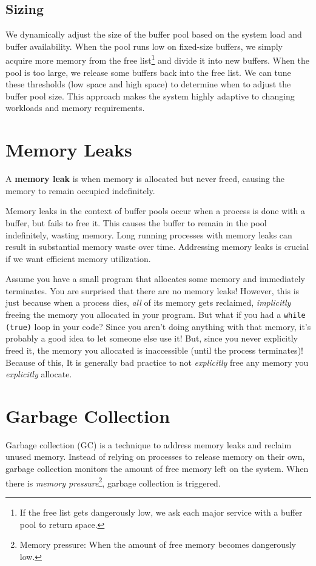 \documentclass{report}
\newcommand{\definitionBegin}[1]{\begin{tcolorbox}[title={Definition: #1}]}
\newcommand{\definitionEnd}{\end{tcolorbox}}
\newcommand{\exampleBegin}[1]{\begin{tcolorbox}[colback=blue!5!white,colframe=black!75!blue,title={Example:
      #1}]}
\newcommand{\exampleEnd}{\end{tcolorbox}}
\begin{document}
\subsection{Sizing}
We dynamically adjust the size of the buffer pool based on the system load and buffer
availability. When the pool runs low on fixed-size buffers, we simply acquire more memory from the
free list\footnote{If the free list gets dangerously low, we ask each major service with a buffer
  pool to return space.} and divide it into new buffers. When the pool is too large, we release some
buffers back into the free list. We can tune these thresholds (low space and high space) to
determine when to adjust the buffer pool size. This approach makes the system highly adaptive to
changing workloads and memory requirements.

\section{Memory Leaks}
\definitionBegin{Memory Leak}
A \textbf{memory leak} is when memory is allocated but never freed, causing the memory to remain
occupied indefinitely.
\definitionEnd

Memory leaks in the context of buffer pools occur when a process is done with a buffer, but fails to
free it. This causes the buffer to remain in the pool indefinitely, wasting memory. Long running
processes with memory leaks can result in substantial memory waste over time. Addressing memory
leaks is crucial if we want efficient memory utilization.

\exampleBegin{Leaky Program}
Assume you have a small program that allocates some memory and immediately terminates. You are
surprised that there are no memory leaks! However, this is just because when a process dies,
\textit{all} of its memory gets reclaimed, \textit{implicitly} freeing the memory you allocated in
your program. But what if you had a \texttt{while (true)} loop in your code? Since you aren't doing
anything with that memory, it's probably a good idea to let someone else use it! But, since you
never explicitly freed it, the memory you allocated is inaccessible (until the process terminates)!
Because of this, It is generally bad practice to not \textit{explicitly} free any memory you
\textit{explicitly} allocate. 
\exampleEnd


\section{Garbage Collection}
Garbage collection (GC) is a technique to address memory leaks and reclaim unused memory. Instead of
relying on processes to release memory on their own, garbage collection monitors the amount of free
memory left on the system. When there is \textit{memory pressure}\footnote{Memory pressure: When the
  amount of free memory becomes dangerously low.}, garbage collection is triggered.
\end{document}
